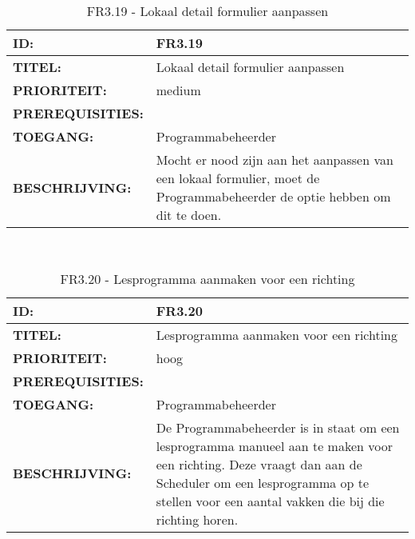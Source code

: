 \noindent\begin{table}[H]
            \begin{tabular}{l | p{10cm}}
                \textbf{ID:} & FR3.19 \\ \hline
                \textbf{TITEL:} & Lokaal detail formulier aanpassen\\ \hline
                \textbf{PRIORITEIT:} &  medium \\ \hline
                \textbf{PREREQUISITIES:} & \\ \hline
                \textbf{TOEGANG:} & Programmabeheerder \\ \hline
                \textbf{BESCHRIJVING:} & Mocht er nood zijn aan het aanpassen van een lokaal formulier, moet de Programmabeheerder de optie hebben om dit te doen.\\ 
            \end{tabular}\\
            \caption{FR3.19 - Lokaal detail formulier aanpassen}
            \label{tab:FR3.19 - Lokaal detail formulier aanpassen}
        \end{table}

\noindent\begin{table}[H]
            \begin{tabular}{l | p{10cm}}
                \textbf{ID:} & FR3.20 \\ \hline
                \textbf{TITEL:} & Lesprogramma aanmaken voor een richting\\ \hline
                \textbf{PRIORITEIT:} &  hoog \\ \hline
                \textbf{PREREQUISITIES:} & \\ \hline
                \textbf{TOEGANG:} & Programmabeheerder \\ \hline
                \textbf{BESCHRIJVING:} & De Programmabeheerder is in staat om een lesprogramma manueel aan te maken voor een richting. Deze vraagt dan aan de Scheduler om een lesprogramma op te stellen voor een aantal vakken die bij die richting horen.\\ 
            \end{tabular}\\
            \caption{FR3.20 - Lesprogramma aanmaken voor een richting}
            \label{tab:FR3.20 - Lesprogramma aanmaken voor een richting}
        \end{table}

